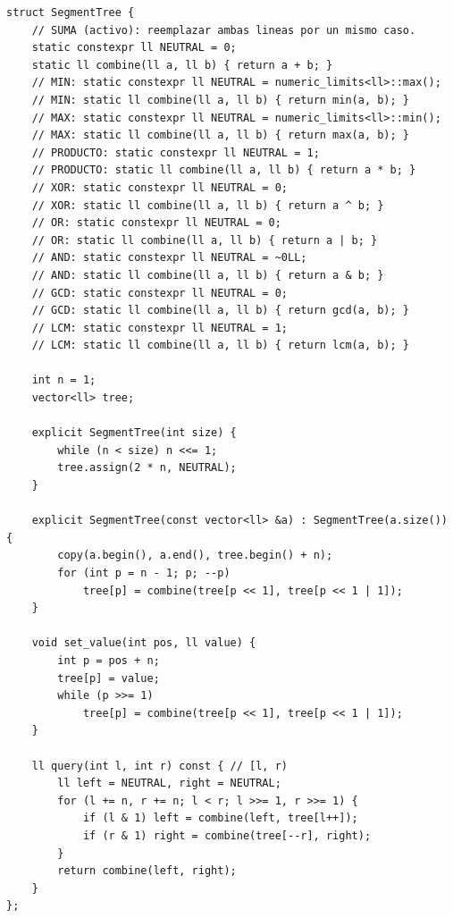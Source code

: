 \begin{lstlisting}[style=cpp]
struct SegmentTree {
    // SUMA (activo): reemplazar ambas lineas por un mismo caso.
    static constexpr ll NEUTRAL = 0;
    static ll combine(ll a, ll b) { return a + b; }
    // MIN: static constexpr ll NEUTRAL = numeric_limits<ll>::max();
    // MIN: static ll combine(ll a, ll b) { return min(a, b); }
    // MAX: static constexpr ll NEUTRAL = numeric_limits<ll>::min();
    // MAX: static ll combine(ll a, ll b) { return max(a, b); }
    // PRODUCTO: static constexpr ll NEUTRAL = 1;
    // PRODUCTO: static ll combine(ll a, ll b) { return a * b; }
    // XOR: static constexpr ll NEUTRAL = 0;
    // XOR: static ll combine(ll a, ll b) { return a ^ b; }
    // OR: static constexpr ll NEUTRAL = 0;
    // OR: static ll combine(ll a, ll b) { return a | b; }
    // AND: static constexpr ll NEUTRAL = ~0LL;
    // AND: static ll combine(ll a, ll b) { return a & b; }
    // GCD: static constexpr ll NEUTRAL = 0;
    // GCD: static ll combine(ll a, ll b) { return gcd(a, b); }
    // LCM: static constexpr ll NEUTRAL = 1;
    // LCM: static ll combine(ll a, ll b) { return lcm(a, b); }

    int n = 1;
    vector<ll> tree;

    explicit SegmentTree(int size) {
        while (n < size) n <<= 1;
        tree.assign(2 * n, NEUTRAL);
    }

    explicit SegmentTree(const vector<ll> &a) : SegmentTree(a.size()) {
        copy(a.begin(), a.end(), tree.begin() + n);
        for (int p = n - 1; p; --p)
            tree[p] = combine(tree[p << 1], tree[p << 1 | 1]);
    }

    void set_value(int pos, ll value) {
        int p = pos + n;
        tree[p] = value;
        while (p >>= 1)
            tree[p] = combine(tree[p << 1], tree[p << 1 | 1]);
    }

    ll query(int l, int r) const { // [l, r)
        ll left = NEUTRAL, right = NEUTRAL;
        for (l += n, r += n; l < r; l >>= 1, r >>= 1) {
            if (l & 1) left = combine(left, tree[l++]);
            if (r & 1) right = combine(tree[--r], right);
        }
        return combine(left, right);
    }
};
\end{lstlisting}


